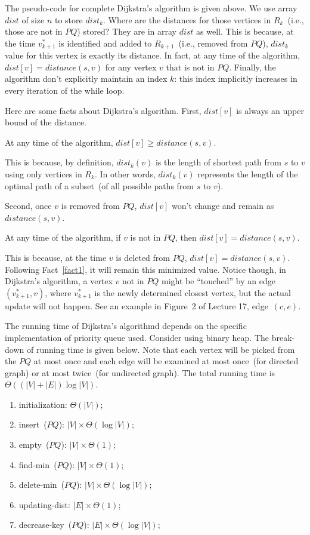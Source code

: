 The pseudo-code for complete Dijkstra's algorithm is given above.
We use array $dist$ of size $n$ to store $dist_k$.
Where are the distances for those vertices in $R_k$~(i.e., those are not in $PQ$) stored?
They are in array $dist$ as well.
This is because, at the time $v_{k+1}^*$ is identified and added to $R_{k+1}$~(i.e., removed from $PQ$),
$dist_k$ value for this vertex is exactly its distance.
In fact, at any time of the algorithm, $dist[v] = distance(s,v)$ for any vertex $v$ that is not in $PQ$.
Finally, the algorithm don't explicitly maintain an index $k$: this index implicitly increases in every iteration of the while loop.


Here are some facts about Dijkstra's algorithm.
First, $dist[v]$ is always an upper bound of the distance.
\begin{fact} \label{fact1}
At any time of the algorithm, $dist[v] \ge distance(s,v)$.
\end{fact}

This is because, by definition, $dist_k(v)$ is the length of 
shortest path from $s$ to $v$ using only vertices in $R_k$.
In other words, $dist_k(v)$ represents the length of the optimal
path of a subset~(of all possible paths from $s$ to $v$).

Second, once $v$ is removed from $PQ$, $dist[v]$ won't change and remain as $distance(s,v)$.
\begin{fact}
At any time of the algorithm, if $v$ is not in $PQ$, then $dist[v] = distance(s,v)$.
\end{fact}
This is because, at the time $v$ is deleted from $PQ$, $dist[v] = distance(s,v)$.
Following Fact~\ref{fact1}, it will remain this minimized value.
Notice though, in Dijkstra's algorithm, a vertex $v$ not in $PQ$ might be ``touched''
by an edge $(v^*_{k+1}, v)$, where $v^*_{k+1}$ is the newly determined closest vertex,
   but the actual update will not happen.
See an example in Figure~2 of Lecture 17, edge~$(c, e)$.

The running time of Dijkstra's algorithmd depends on the specific implementation of priority queue used.
Consider using binary heap. The break-down of running time is given below.
Note that each vertex will be picked from the $PQ$ at most once and each edge will be examined at most once~(for directed graph) or at most twice~(for undirected graph).
The total running time is $\Theta((|V|+|E|)\log |V|)$.
\vspace*{-\topsep}
\begin{enumerate}
\item initialization: $\Theta(|V|)$;
\item insert~($PQ$): $|V| \times \Theta(\log |V|)$;
\item empty~($PQ$): $|V| \times \Theta(1)$;
\item find-min~($PQ$): $|V| \times \Theta(1)$;
\item delete-min~($PQ$): $|V| \times \Theta(\log |V|)$;
\item updating-dist: $|E| \times \Theta(1)$;
\item decrease-key~($PQ$): $|E| \times \Theta(\log |V|)$;
\end{enumerate}

